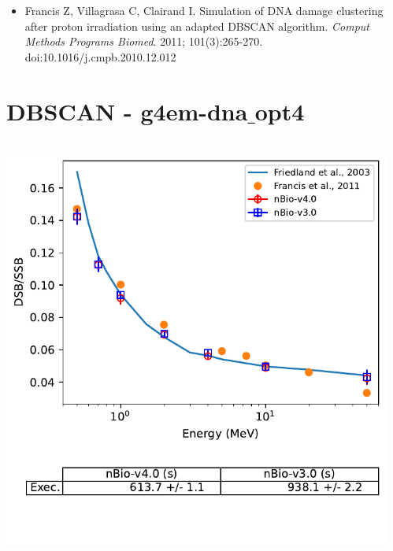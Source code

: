 \documentclass[aspectratio=1610]{beamer}
\begin{document}
\begin{frame}{\secname}
\begin{columns}
\begin{column}{0.6\linewidth}
  \end{column}
 \end{columns}
\begin{itemize}
\item \tiny{Francis Z, Villagrasa C, Clairand I. Simulation of DNA damage clustering after proton irradiation using an adapted DBSCAN algorithm. \textit{Comput Methods Programs Biomed}. 2011; 101(3):265-270. doi:10.1016/j.cmpb.2010.12.012}
\end{itemize}
\end{frame}

\section{DBSCAN - g4em-dna$\_$opt4}

\begin{frame}{\secname}
 \begin{columns}
  \begin{column}{0.4\linewidth}
   \includegraphics[width=1.1\textwidth]{./DBSCAN/DBSCAN2_g4em-dna_opt4}
  \end{column}
  \begin{column}{0.6\linewidth} 

\end{column}
\end{columns}
\end{frame}
\end{document}
